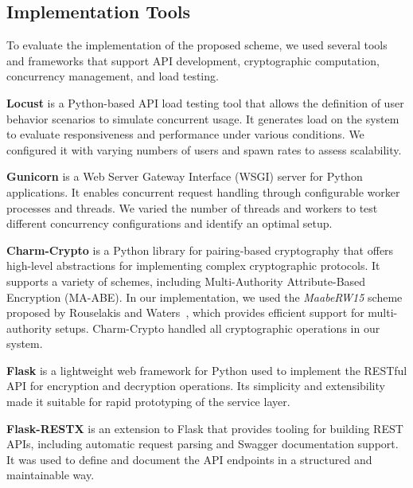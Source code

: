 \documentclass[cic,tc,english]{iiufrgs}
\begin{document}
            
            \subsection{Implementation Tools}
            \label{subsec:tools}

                To evaluate the implementation of the proposed scheme, we used several tools and frameworks that support API development, cryptographic computation, concurrency management, and load testing.

                \textbf{Locust} is a Python-based API load testing tool that allows the definition of user behavior scenarios to simulate concurrent usage. It generates load on the system to evaluate responsiveness and performance under various conditions. We configured it with varying numbers of users and spawn rates to assess scalability.

                \textbf{Gunicorn} is a Web Server Gateway Interface (WSGI) server for Python applications. It enables concurrent request handling through configurable worker processes and threads. We varied the number of threads and workers to test different concurrency configurations and identify an optimal setup.

                \textbf{Charm-Crypto} is a Python library for pairing-based cryptography that offers high-level abstractions for implementing complex cryptographic protocols. It supports a variety of schemes, including Multi-Authority Attribute-Based Encryption (MA-ABE). In our implementation, we used the \emph{MaabeRW15} scheme proposed by Rouselakis and Waters~\citep{rouselakis2015efficient}, which provides efficient support for multi-authority setups. Charm-Crypto handled all cryptographic operations in our system.

                \textbf{Flask} is a lightweight web framework for Python used to implement the RESTful API for encryption and decryption operations. Its simplicity and extensibility made it suitable for rapid prototyping of the service layer.

                \textbf{Flask-RESTX} is an extension to Flask that provides tooling for building REST APIs, including automatic request parsing and Swagger documentation support. It was used to define and document the API endpoints in a structured and maintainable way.

\end{document}
